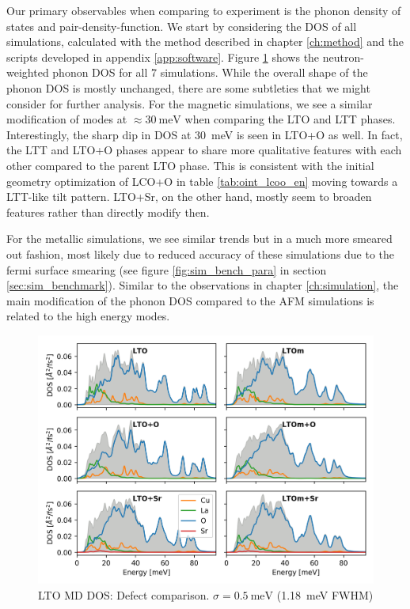 Our primary observables when comparing to experiment is the phonon density of states and pair-density-function. We start by considering the DOS of all simulations, calculated with the method described in chapter \ref{ch:method} and the scripts developed in appendix \ref{app:software}. Figure \ref{fig:lto_md_defect_comparison} shows the neutron-weighted phonon DOS for all 7 simulations. While the overall shape of the phonon DOS is mostly unchanged, there are some subtleties that we might consider for further analysis. For the magnetic simulations, we see a similar modification of modes at $\approx \SI{30}{\milli\eV}$ when comparing the LTO and LTT phases. Interestingly, the sharp dip in DOS at \SI{30}{\milli\eV} is seen in LTO+O as well. In fact, the LTT and LTO+O phases appear to share more qualitative features with each other compared to the parent LTO phase. This is consistent with the initial geometry optimization of LCO+O in table \ref{tab:oint_lcoo_en} moving towards a LTT-like tilt pattern. LTO+Sr, on the other hand, mostly seem to broaden features rather than directly modify then. 

For the metallic simulations, we see similar trends but in a much more smeared out fashion, most likely due to reduced accuracy of these simulations due to the fermi surface smearing (see figure \ref{fig:sim_bench_para} in section \ref{sec:sim_benchmark}). Similar to the observations in chapter \ref{ch:simulation}, the main modification of the phonon DOS compared to the AFM simulations is related to the high energy modes.

\begin{figure}
	\centering
	\includegraphics[width=\textwidth]{fig/md/lto_defect_comparison.png}
	\caption[LTO MD DOS: Defect comparison]{LTO MD DOS: Defect comparison. $\sigma=\SI{0.5}{\milli\eV}$ (\SI{1.18}{\milli\eV} FWHM)}
	\label{fig:lto_md_defect_comparison}
\end{figure}

